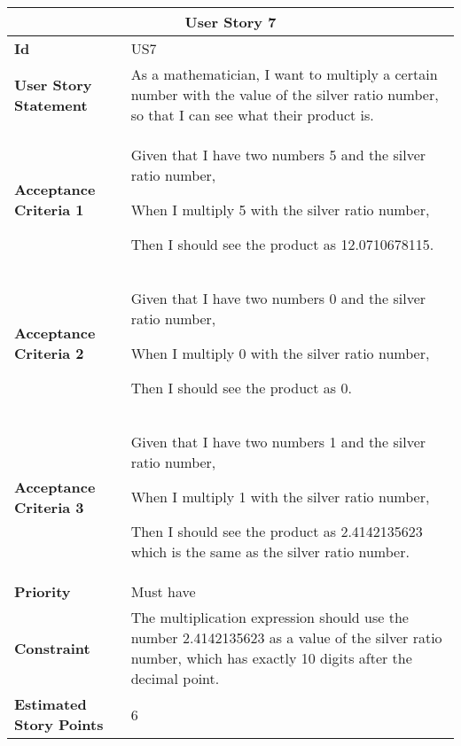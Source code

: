 \hspace{1cm}
\begin{center}
\begin{tabular}{ | m{2cm} | m{12cm} | } 

 \hline
 \multicolumn{2}{|c|}{\textbf{User Story 7}} \\

\hline
\textbf{Id} & US7 \\ 

\hline
\textbf{User Story Statement} & As a mathematician, I want to multiply a certain number with the value of the silver ratio number, so that I can see what their product is.\\ 

\hline
\textbf{Acceptance Criteria 1} & Given that I have two numbers 5 and the silver ratio number, 

When I multiply 5 with the silver ratio number,

Then I should see the product as 12.0710678115.\\ 

\hline
\textbf{Acceptance Criteria 2} & Given that I have two numbers 0 and the silver ratio number, 

When I multiply 0 with the silver ratio number,

Then I should see the product as 0.\\ 

\hline
\textbf{Acceptance Criteria 3} & Given that I have two numbers 1 and the silver ratio number, 

When I multiply 1 with the silver ratio number,

Then I should see the product as 2.4142135623 which is the same as the silver ratio number.\\ 

\hline
\textbf{Priority} & Must have \\ 

\hline
\textbf{Constraint} & The multiplication expression should use the number 2.4142135623 as a value of the silver ratio number, which has exactly 10 digits after the decimal point.\\ 

\hline
\textbf{Estimated Story Points} & 6 \\ 
\hline

\end{tabular}
\end{center}

